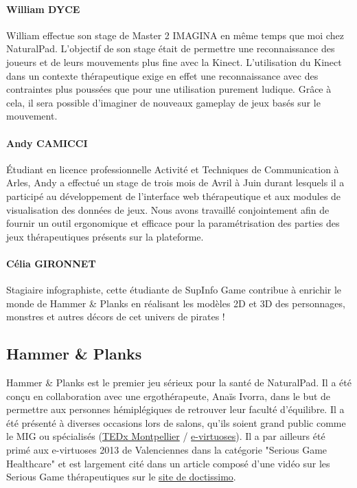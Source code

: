 		\paragraph{William DYCE\\}
William effectue son stage de Master 2 IMAGINA en même temps que moi chez NaturalPad. L'objectif de son stage était de permettre une reconnaissance des joueurs et de leurs mouvements plus fine avec la Kinect. L'utilisation du Kinect dans un contexte thérapeutique exige en effet une reconnaissance avec des contraintes plus poussées que pour une utilisation purement ludique. Grâce à cela, il sera possible d’imaginer de nouveaux gameplay de jeux basés sur le mouvement.

		\paragraph{Andy CAMICCI\\}
Étudiant en licence professionnelle Activité et Techniques de Communication à Arles, Andy a effectué un stage de trois mois de Avril à Juin durant lesquels il a participé au développement de l'interface web thérapeutique et aux modules de visualisation des données de jeux. Nous avons travaillé conjointement afin de fournir un outil ergonomique et efficace pour la paramétrisation des parties des jeux thérapeutiques présents sur la plateforme.
		
		\paragraph{Célia GIRONNET\\}
Stagiaire infographiste, cette étudiante de SupInfo Game contribue à enrichir le monde de Hammer \& Planks en réalisant les modèles 2D et 3D des personnages, monstres et autres décors de cet univers de pirates !

	\subsection{Hammer \& Planks}
Hammer \& Planks est le premier jeu sérieux pour la santé de NaturalPad. Il a été conçu en collaboration avec une ergothérapeute, Anaïs Ivorra, dans le but de permettre aux personnes hémiplégiques de retrouver leur faculté d’équilibre. Il a été présenté à diverses occasions lors de salons, qu’ils soient grand public comme le MIG ou spécialisés (\href{http://www.ted.com/tedx/events/5188}{TEDx Montpellier} / \href{http://www.e-virtuoses.net/}{e-virtuoses}). Il a par ailleurs été primé aux e-virtuoses 2013 de Valenciennes dans la catégorie "Serious Game Healthcare" et est largement cité dans un article composé d'une vidéo sur les Serious Game thérapeutiques sur le \href{http://videos.doctissimo.fr/sante/recherche/serious-game-therapeutique.html}{site de doctissimo}.
		
